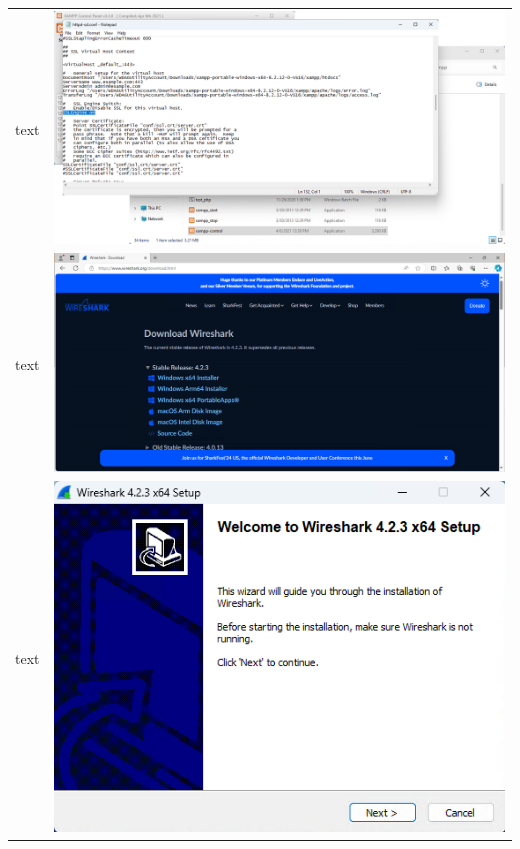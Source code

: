 \documentclass[11pt]{report}
\begin{document}
\begin{tabular}{ l r }
            text & \includegraphics[scale=1.0]{xampp16} \\
            text & \includegraphics[scale=1.0]{wireshark01} \\
            text & \includegraphics[scale=1.0]{wireshark02} \\

\end{tabular}
\end{document}
